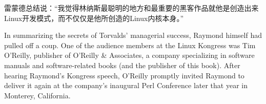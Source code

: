 \ifdefined\chs
雷蒙德总结说：``我觉得林纳斯最聪明的地方和最重要的黑客作品就他是创造出来Linux开发模式，而不仅仅是他所创造的Linux内核本身。''
\fi




\ifdefined\eng
In summarizing the secrets of Torvalds' managerial success, Raymond himself had pulled off a coup. One of the audience members at the Linux Kongress was Tim O'Reilly, publisher of O'Reilly \& Associates, a company specializing in software manuals and software-related books (and the publisher of this book). After hearing Raymond's Kongress speech, O'Reilly promptly invited Raymond to deliver it again at the company's inaugural Perl Conference later that year in Monterey, California.
\fi

